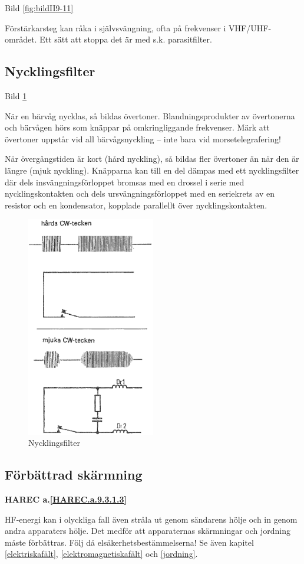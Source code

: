 Bild \ref{fig:bildII9-11}

Förstärkarsteg kan råka i självsvängning, ofta på frekvenser i
VHF/UHF-området. Ett sätt att stoppa det är med s.k. parasitfilter.

\subsection{Nycklingsfilter}

Bild \ref{fig:bildII9-12}

När en bärvåg nycklas, så bildas övertoner.  Blandningsprodukter av
övertonerna och bärvågen hörs som knäppar på omkringliggande
frekvenser. Märk att övertoner uppstår vid all bärvågsnyckling -- inte
bara vid morsetelegrafering!

När övergångstiden är kort (hård nyckling), så bildas fler övertoner
än när den är längre (mjuk nyckling). Knäpparna kan till en del dämpas
med ett nycklingsfilter där dels insvängningsförloppet bromsas med en
drossel i serie med nycklingskontakten och dels ursvängningsförloppet
med en seriekrets av en resistor och en kondensator, kopplade
parallellt över nycklingskontakten.

\begin{figure}
  \includegraphics[width=0.5\textwidth]{images/cropped_pdfs/bild_2_9-12.pdf}
  \caption{Nycklingsfilter}
  \label{fig:bildII9-12}
\end{figure}

\subsection{Förbättrad skärmning}
\textbf{
HAREC a.\ref{HAREC.a.9.3.1.3}\label{myHAREC.a.9.3.1.3}
}

HF-energi kan i olyckliga fall även stråla ut genom sändarens hölje
och in genom andra apparaters hölje. Det medför att apparaternas
skärmningar och jordning måste förbättras. Följ då
elsäkerhetsbestämmelserna!  Se även kapitel \ref{elektriskafält},
\ref{elektromagnetiskafält} och \ref{jordning}.
